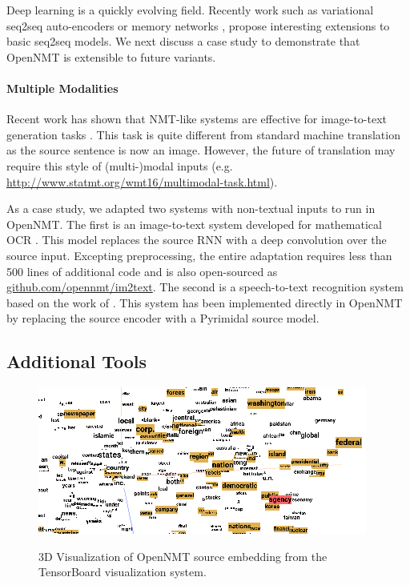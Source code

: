 \documentclass[11pt,a4paper]{article}
\begin{document}
Deep learning is a quickly evolving field. Recently work such as
variational seq2seq auto-encoders
\cite{DBLP:conf/conll/BowmanVVDJB16} or memory networks
\cite{DBLP:journals/corr/WestonCB14}, propose interesting extensions
to basic seq2seq models. We next discuss a case study to demonstrate that OpenNMT
is extensible to future variants.





\paragraph{Multiple Modalities}

Recent work has shown that NMT-like systems are effective for
image-to-text generation tasks
\cite{DBLP:journals/corr/XuBKCCSZB15}. This task is quite different
from standard machine translation as the source sentence is now an
image.  However, the future of translation may require this style of
(multi-)modal inputs
(e.g. \url{http://www.statmt.org/wmt16/multimodal-task.html}).  

As a case study, we adapted two systems with non-textual inputs to run
in OpenNMT. The first is an image-to-text system developed for
mathematical OCR \cite{DBLP:journals/corr/DengKR16}.  This model
replaces the source RNN with a deep convolution over the source
input. Excepting preprocessing, the entire adaptation requires less
than 500 lines of additional code and is also open-sourced as
\url{github.com/opennmt/im2text}.  The second is a speech-to-text recognition
system based on the work of \citet{DBLP:journals/corr/ChanJLV15}.
This system has been implemented directly in OpenNMT by replacing the
source encoder with a Pyrimidal source model.

\subsection{Additional Tools}

\begin{figure}
  \centering
  \includegraphics[width=\linewidth]{TensorBoard}
  \label{fig:tensor}
  \caption{\small 3D Visualization of OpenNMT source embedding from the TensorBoard visualization system.}
\end{figure}
\end{document}
